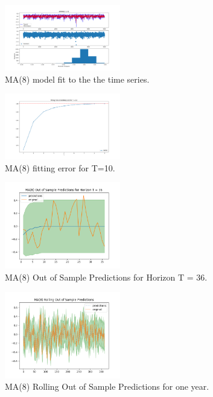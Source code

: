 \documentclass[conference]{IEEEtran}
\begin{document}
\begin{figure}[ht]
    \centering
    \includegraphics[width=0.45\textwidth]{Figures/GlasnevinLin/ARIMA(0,0,8).png}
    \caption{MA(8) model fit to the the time series.}
    \label{ma8}
\end{figure}

\begin{figure}[ht]
    \centering
    \includegraphics[width=0.45\textwidth]{Figures/GlasnevinLin/Fitting Error of ARIMA(0,0,8) for T = 10.png}
    \caption{MA(8) fitting error for T=10.}
    \label{fe8}
\end{figure}

\begin{figure}[ht]
    \centering
    \includegraphics[width=0.45\textwidth]{Figures/GlasnevinLin/MA(8) Out of Sample Predictions for Horizon T = 36.png}
    \caption{MA(8) Out of Sample Predictions for Horizon T = 36.}
    \label{hor8}
\end{figure}
\vspace{80mm}

\begin{figure}[ht]
    \centering
    \includegraphics[width=0.45\textwidth]{Figures/GlasnevinLin/MA(8) Rolling Out of Sample Predictions.png}
    \caption{MA(8) Rolling Out of Sample Predictions for one year.}
    \label{rol8}
\end{figure}
\end{document}
